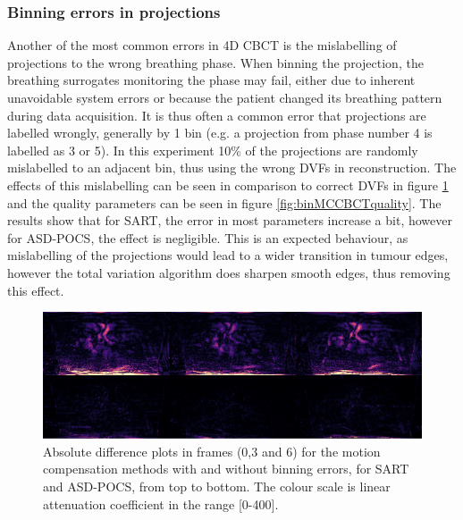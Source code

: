 \subsubsection{Binning errors in projections}
Another of the most common errors in 4D CBCT is the mislabelling of projections to the wrong breathing phase. When binning the projection, the breathing surrogates monitoring the phase may fail, either due to inherent unavoidable system errors or because the patient changed its breathing pattern during data acquisition. It is thus often a common error that projections are labelled wrongly, generally by 1 bin (e.g. a projection from phase number 4 is labelled as 3 or 5). In this experiment 10\% of the projections are randomly mislabelled to an adjacent bin, thus using the wrong DVFs in reconstruction. The effects of this mislabelling can be seen in comparison to correct DVFs in figure \ref{fig:binMCCBCT3static} and the quality parameters can be seen in figure \ref{fig:binMCCBCTquality}. The results show that for SART, the error in most parameters increase a bit, however for ASD-POCS, the effect is negligible. This is an expected behaviour, as mislabelling of the projections would lead to a wider transition in tumour edges, however the total variation algorithm does sharpen smooth edges, thus removing this effect.


\begin{figure}
\begin{center}

\includegraphics[width=\textwidth]{accuracyMC/diffbinninMCCBCT3stage.png} 


\end{center}

\caption[Three difference frames of the  motion compensation methods with projection binning errors]{\label{fig:binMCCBCT3static} Absolute difference plots in frames (0,3 and 6) for the motion compensation methods with and without binning errors, for SART and ASD-POCS, from top to bottom.  The colour scale is linear attenuation coefficient in the range [0-400].} 
\end{figure}


